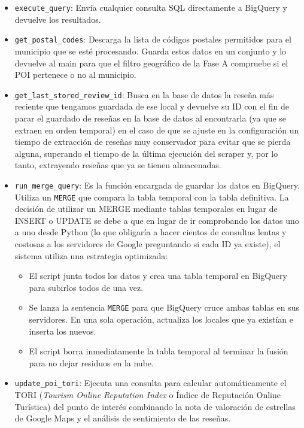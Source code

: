 \begin{itemize}
    \item \texttt{execute\_query}: Envía cualquier consulta SQL directamente a BigQuery y devuelve los resultados.
    
    \item \texttt{get\_postal\_codes}: Descarga la lista de códigos postales permitidos para el municipio que se esté procesando. Guarda estos datos en un conjunto y lo devuelve al main para que el filtro geográfico de la Fase A compruebe si el POI pertenece o no al municipio.
    
    \item \texttt{get\_last\_stored\_review\_id}: Busca en la base de datos la reseña más reciente que tengamos guardada de ese local y devuelve su ID con el fin de parar el guardado de reseñas en la base de datos al encontrarla (ya que se extraen en orden temporal) en el caso de que se ajuste en la configuración un tiempo de extracción de reseñas muy conservador para evitar que se pierda alguna, superando el tiempo de la última ejecución del scraper y, por lo tanto, extrayendo reseñas que ya se tienen almacenadas.
    
    \item \texttt{run\_merge\_query}: Es la función encargada de guardar los datos en BigQuery. Utiliza un \texttt{MERGE} que compara la tabla temporal con la tabla definitiva. La decisión de utilizar un MERGE mediante tablas temporales en lugar de INSERT o UPDATE se debe a que en lugar de ir comprobando los datos uno a uno desde Python (lo que obligaría a hacer cientos de consultas lentas y costosas a los servidores de Google preguntando si cada ID ya existe), el sistema utiliza una estrategia optimizada:
    \begin{itemize}
        \item El script junta todos los datos y crea una tabla temporal en BigQuery para subirlos todos de una vez.
        \item Se lanza la sentencia \texttt{MERGE} para que BigQuery cruce ambas tablas en sus servidores. En una sola operación, actualiza los locales que ya existían e inserta los nuevos.
        \item El script borra inmediatamente la tabla temporal al terminar la fusión para no dejar residuos en la nube.
    \end{itemize}    
        
    \item \texttt{update\_poi\_tori}: Ejecuta una consulta para calcular automáticamente el TORI (\textit{Tourism Online Reputation Index} o Índice de Reputación Online Turística) del punto de interés combinando la nota de valoración de estrellas de Google Maps y el análisis de sentimiento de las reseñas.
    

\end{itemize}
